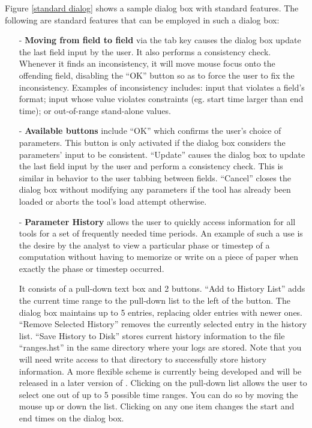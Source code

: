 \documentclass[10pt]{article}
\begin{document}
Figure \ref{standard dialog} shows a sample dialog box with standard
features. The following are standard features that can be employed in
such a dialog box:

\begin{itemize}
\item[-] {\bf Moving from field to field} via the tab key causes the
dialog box update the last field input by the user. It also performs a
consistency check. Whenever it finds an inconsistency, it will move
mouse focus onto the offending field, disabling the ``OK'' button so
as to force the user to fix the inconsistency. Examples of
inconsistency includes: input that violates a field's format; input
whose value violates constraints (eg. start time larger than end
time); or out-of-range stand-alone values.
\item[-] {\bf Available buttons} include ``OK'' which confirms the
user's choice of parameters. This button is only activated if the
dialog box considers the parameters' input to be
consistent. ``Update'' causes the dialog box to update the last field
input by the user and perform a consistency check. This is similar in
behavior to the user tabbing between fields. ``Cancel'' closes the
dialog box without modifying any parameters if the tool has already
been loaded or aborts the tool's load attempt otherwise.
\item[-] {\bf Parameter History} allows the user to quickly access
information for all tools for a set of frequently needed time
periods. An example of such a use is the desire by the analyst to view
a particular phase or timestep of a computation without having to
memorize or write on a piece of paper when exactly the phase or
timestep occurred.

It consists of a pull-down text box and 2 buttons. ``Add to History
List'' adds the current time range to the pull-down list to the left
of the button. The dialog box maintains up to 5 entries, replacing
older entries with newer ones. ``Remove Selected History'' removes the
currently selected entry in the history list. ``Save History to Disk''
stores current history information to the file ``ranges.hst'' in the
same directory where your logs are stored. Note that you will need
write access to that directory to successfully store history
information. A more flexible scheme is currently being developed and
will be released in a later version of \projections{}. Clicking on the
pull-down list allows the user to select one out of up to 5 possible
time ranges. You can do so by moving the mouse up or down the
list. Clicking on any one item changes the start and end times on the
dialog box.
\end{itemize}
\end{document}
